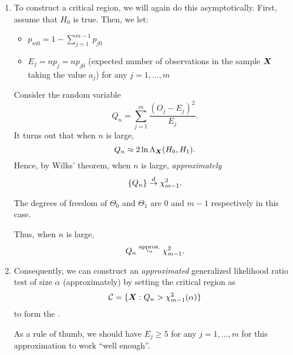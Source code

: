 \begin{enumerate}
\item To construct a critical region, we will again do this asymptotically. 
First, assume that \(H_0\) is true. Then, we let:
\begin{itemize}
\item \(p_{m0}=1-\sum_{j=1}^{m-1}p_{j0}\)
\item \(E_j=np_j=np_{j0}\) (expected number of observations in the sample
\(\vb*{X}\) taking the value \(a_j\)) for any \(j=1,\dotsc,m\)
\end{itemize}
Consider the random variable
\[
Q_n=\sum_{j=1}^{m}\frac{(O_j-E_j)^2}{E_j}.
\]
It turns out that when \(n\) is large,
\[
Q_n\approx 2\ln\Lambda_{\vb*{X}}(H_0,H_1).
\]
Hence, by Wilks' theorem, when \(n\) is large, \emph{approximately}
\[
\{Q_n\}\overset{d}{\to}\chi^2_{m-1}.
\]
\begin{note}
The degrees of freedom of \(\Theta_0\) and \(\Theta_1\) are 0 and \(m-1\)
respectively in this case.
\end{note}

Thus, when \(n\) is large,
\[
Q_n\overset{\text{approx.}}\sim\chi^2_{m-1}. 
\]

\item
Consequently, we can construct an \emph{approximated} generalized likelihood
ratio test of size \(\alpha\) (approximately) by setting the critical region as
\[
\mathcal{C}=\{\vb*{X}:Q_n>\chi^2_{m-1}(\alpha)\}
\]
to form the .

\begin{note}
As a rule of thumb, we should have \(E_j\ge 5\) for any
\(j=1,\dotsc,m\) for this approximation to work ``well enough''.
\end{note}
\end{enumerate}
